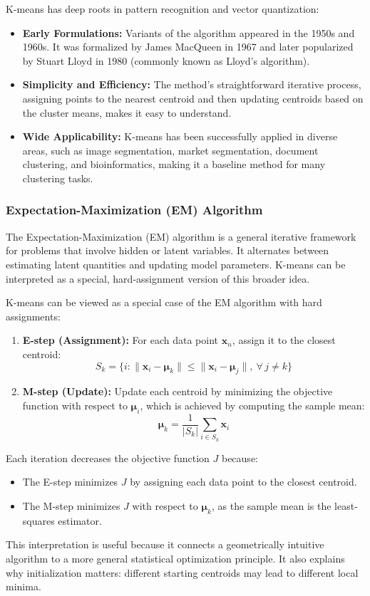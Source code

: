 \documentclass[12pt]{article}
\begin{document}
K-means has deep roots in pattern recognition and vector quantization:
\begin{itemize}
    \item \textbf{Early Formulations:} Variants of the algorithm appeared in the 1950s and 1960s. It was formalized by James MacQueen in 1967 and later popularized by Stuart Lloyd in 1980 (commonly known as Lloyd’s algorithm).
    \item \textbf{Simplicity and Efficiency:} The method's straightforward iterative process, assigning points to the nearest centroid and then updating centroids based on the cluster means, makes it easy to understand.
    \item \textbf{Wide Applicability:} K-means has been successfully applied in diverse areas, such as image segmentation, market segmentation, document clustering, and bioinformatics, making it a baseline method for many clustering tasks.
\end{itemize}


\subsubsection{Expectation-Maximization (EM) Algorithm}
The Expectation-Maximization (EM) algorithm is a general iterative framework for problems that involve hidden or latent variables. It alternates between estimating latent quantities and updating model parameters. K-means can be interpreted as a special, hard-assignment version of this broader idea.


K-means can be viewed as a special case of the EM algorithm with hard assignments:
\begin{enumerate}
    \item \textbf{E-step (Assignment):} For each data point $\bm{x}_n$, assign it to the closest centroid:
    \begin{equation}
    S_k = \{ i : \lVert \bm{x}_i - \bm{\mu}_k \rVert \leq \lVert \bm{x}_i - \bm{\mu}_j \rVert,\ \forall\, j \neq k \}
    \end{equation}
    \item \textbf{M-step (Update):} Update each centroid by minimizing the objective function with respect to $\bm{\mu}_i$, which is achieved by computing the sample mean:
    \begin{equation}
    \bm{\mu}_k = \frac{1}{|S_k|} \sum_{i \in S_k} \bm{x}_i
    \end{equation}
\end{enumerate}
Each iteration decreases the objective function $J$ because:
\begin{itemize}
    \item The E-step minimizes $J$ by assigning each data point to the closest centroid.
    \item The M-step minimizes $J$ with respect to $\bm{\mu}_k$, as the sample mean is the least-squares estimator.
\end{itemize}
This interpretation is useful because it connects a geometrically intuitive algorithm to a more general statistical optimization principle. It also explains why initialization matters: different starting centroids may lead to different local minima.
\end{document}
